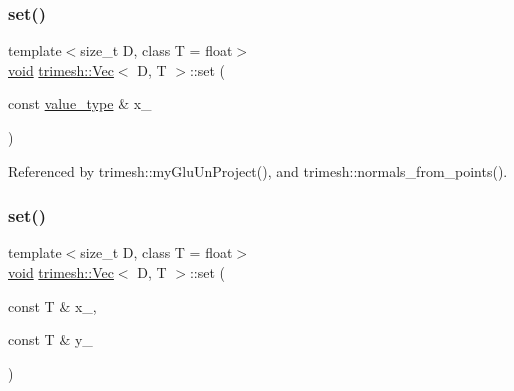 \mbox{\label{classtrimesh_1_1Vec_ab65be30cd5fe17ca7222b4d3eaf9e0aa}} 
\subsubsection{\texorpdfstring{set()}{set()}\hspace{0.1cm}{\footnotesize\ttfamily [1/4]}}
{\footnotesize\ttfamily template$<$size\+\_\+t D, class T = float$>$ \\
\hyperlink{namespacetrimesh_a784ddfd979e1c579bda795a8edfc3f43}{void} \hyperlink{classtrimesh_1_1Vec}{trimesh\+::\+Vec}$<$ D, T $>$\+::set (\begin{DoxyParamCaption}\item[{const \hyperlink{classtrimesh_1_1Vec_a10a59253996e42d67c713f37592669df}{value\+\_\+type} \&}]{x\+\_\+ }\end{DoxyParamCaption})\hspace{0.3cm}{\ttfamily [inline]}}



Referenced by trimesh\+::my\+Glu\+Un\+Project(), and trimesh\+::normals\+\_\+from\+\_\+points().

\mbox{\label{classtrimesh_1_1Vec_a5f3bc167ab76a74f2fc6948bf89053e9}} 
\subsubsection{\texorpdfstring{set()}{set()}\hspace{0.1cm}{\footnotesize\ttfamily [2/4]}}
{\footnotesize\ttfamily template$<$size\+\_\+t D, class T = float$>$ \\
\hyperlink{namespacetrimesh_a784ddfd979e1c579bda795a8edfc3f43}{void} \hyperlink{classtrimesh_1_1Vec}{trimesh\+::\+Vec}$<$ D, T $>$\+::set (\begin{DoxyParamCaption}\item[{const T \&}]{x\+\_\+,  }\item[{const T \&}]{y\+\_\+ }\end{DoxyParamCaption})\hspace{0.3cm}{\ttfamily [inline]}}

\mbox{\label{classtrimesh_1_1Vec_a6d413017fad20795340af7a7782ec9ee}} 

